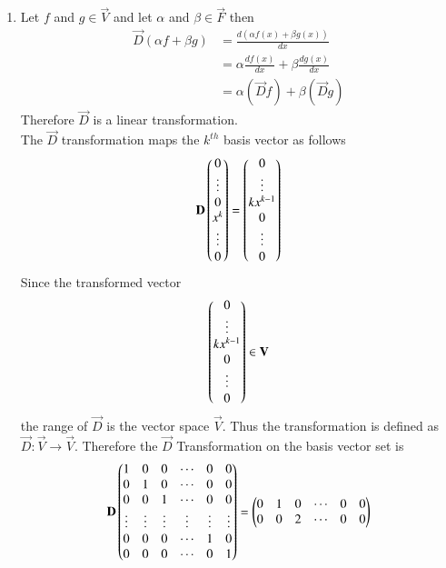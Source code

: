 \documentclass[journal,12pt,twocolumn]{IEEEtran}
\begin{document}
\begin{enumerate}[label=\emph{\alph*)}]
\item
Let $f$ and $g \in \vec{V}$ and let $\alpha$ and $\beta \in \vec{F}$ then 
		\begin{align}
			\vec{D}(\alpha f + \beta g)&=\frac{d(\alpha f(x) + \beta g(x))}{dx} \\
			&=\alpha\frac{df(x)}{dx}+\beta\frac{dg(x)}{dx}\\
			&=\alpha(\vec{D}f)+\beta(\vec{D}g)
		\end{align}
Therefore $\vec{D}$ is a linear transformation.\\
The $\vec{D}$ transformation maps the $k^{th}$ basis vector as follows
		\begin{align}
			\mathbf{D}\begin{pmatrix}0\\\vdots\\0\\x^k\\\vdots\\0\end{pmatrix}
			=\begin{pmatrix}0\\\vdots\\kx^{k-1}\\0\\\vdots\\0\end{pmatrix}
		\end{align}
Since the transformed vector 
		\begin{align}
			\begin{pmatrix}0\\\vdots\\kx^{k-1}\\0\\\vdots\\0\end{pmatrix} \in \mathbf{V}
		\end{align}
the range of $\vec{D}$ is the vector space $\vec{V}$. Thus the transformation is defined as
$\vec{D}:\vec{V} \rightarrow \vec{V}$.
Therefore the $\vec{D}$ Transformation on the basis vector set is
		\begin{align}
			\mathbf{D}\begin{pmatrix}1 & 0 & 0 & \cdots & 0 & 0\\
				      0 & 1 & 0 & \cdots & 0 & 0 \\
				      0 & 0 & 1 & \cdots & 0 & 0 \\
				      \vdots & \vdots & \vdots & \vdots & \vdots & \vdots\\
				      0 & 0 & 0 & \cdots & 1 & 0 \\
				      0 & 0 & 0 & \cdots & 0 & 1\end{pmatrix}
			      =\begin{pmatrix}0 & 1 & 0 & \cdots & 0 & 0\\
				      0 & 0 & 2 & \cdots & 0 & 0\\
\end{pmatrix}
\end{align}
\end{enumerate}
\end{document}
